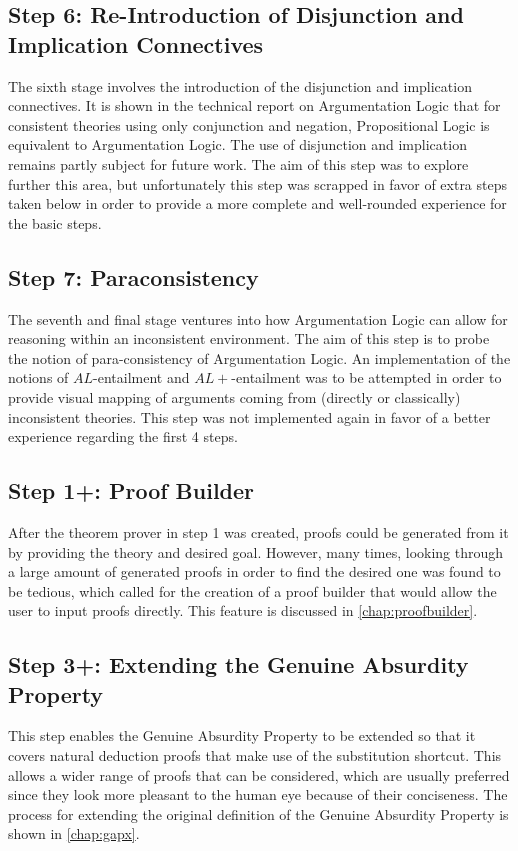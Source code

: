 \documentclass[11pt,twoside,a4paper]{report}
\begin{document}
\subsection{Step 6: Re-Introduction of Disjunction and Implication Connectives}
The sixth stage involves the introduction of the disjunction and implication connectives. It is shown in the technical report on Argumentation Logic that for consistent theories using only conjunction and negation, Propositional Logic is equivalent to Argumentation Logic. The use of disjunction and implication remains partly subject for future work. The aim of this step was to explore further this area, but unfortunately this step was scrapped in favor of extra steps taken below in order to provide a more complete and well-rounded experience for the basic steps.

\subsection{Step 7: Paraconsistency}
The seventh and final stage ventures into how Argumentation Logic can allow for reasoning within an inconsistent environment. The aim of this step is to probe the notion of para-consistency of Argumentation Logic. An implementation of the notions of $AL$-entailment and $AL+$-entailment was to be attempted in order to provide visual mapping of arguments coming from (directly or classically) inconsistent theories. This step was not implemented again in favor of a better experience regarding the first 4 steps.

\subsection{Step 1+: Proof Builder}
After the theorem prover in step 1 was created, proofs could be generated from it by providing the theory and desired goal. However, many times, looking through a large amount of generated proofs in order to find the desired one was found to be tedious, which called for the creation of a proof builder that would allow the user to input proofs directly. This feature is discussed in \autoref{chap:proofbuilder}.

\subsection{Step 3+: Extending the Genuine Absurdity Property}
This step enables the Genuine Absurdity Property to be extended so that it covers natural deduction proofs that make use of the substitution shortcut. This allows a wider range of proofs that can be considered, which are usually preferred since they look more pleasant to the human eye because of their conciseness. The process for extending the original definition of the Genuine Absurdity Property is shown in \autoref{chap:gapx}.
\end{document}
